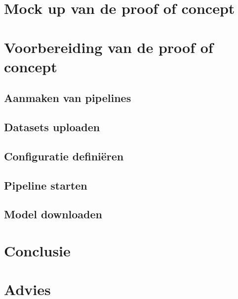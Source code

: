 \section{Mock up van de proof of concept}\label{sec:ch7-mock-up-van-de-proof-of-concept}

\section{Voorbereiding van de proof of concept}\label{sec:ch7-voorbereiding-van-de-proof-of-concept}

\subsection{Aanmaken van pipelines}\label{subsec:ch7-aanmaken-van-pipelines}
\subsection{Datasets uploaden}\label{subsec:ch7-datasets-uploaden}
\subsection{Configuratie definiëren}\label{subsec:ch7-configuratie-definieren}
\subsection{Pipeline starten}\label{subsec:ch7-pipeline-starten}
\subsection{Model downloaden}\label{subsec:ch7-model-downloaden}


\section{Conclusie}\label{sec:ch7-conclusie}
\section{Advies}\label{sec:ch7-advies}